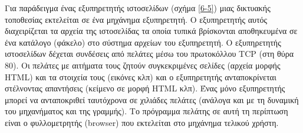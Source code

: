 Για παράδειγμα ένας εξυπηρετητής ιστοσελίδων (σχήμα \ref{6-5}) μιας δικτυακής τοποθεσίας εκτελείται σε ένα μηχάνημα εξυπηρετητή. Ο εξυπηρετητής αυτός διαχειρίζεται τα αρχεία της ιστοσελίδας τα οποία τυπικά βρίσκονται αποθηκευμένα σε ένα κατάλογο (φάκελο) στο σύστημα αρχείων του εξυπηρετητή. Ο εξυπηρετητής ιστοσελίδων δέχεται συνδέσεις από πελάτες μέσω του πρωτοκόλλου TCP (στη θύρα 80). Οι πελάτες με αιτήματα τους ζητούν συγκεκριμένες σελίδες (αρχεία μορφής HTML) και τα στοιχεία τους (εικόνες κλπ) και ο εξυπηρετητής ανταποκρίνεται στέλνοντας απαντήσεις (κείμενο σε μορφή HTML κλπ).  Ένας μόνο εξυπηρετητής μπορεί να ανταποκριθεί ταυτόχρονα σε χιλιάδες πελάτες (ανάλογα και με τη δυναμική του μηχανήματος και της γραμμής). Το πρόγραμμα πελάτης σε αυτή τη περίπτωση είναι ο φυλλομετρητής (browser) που εκτελείται στο μηχάνημα τελικού χρήστη. 